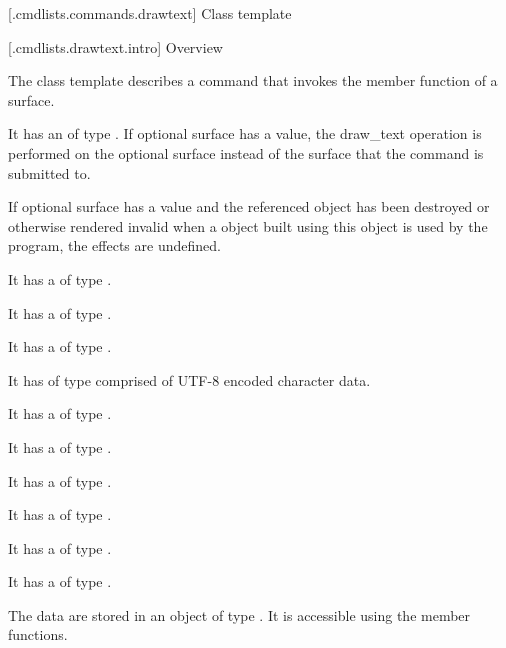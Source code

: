 
 [\iotwod.cmdlists.commands.drawtext] {Class template }

 [\iotwod.cmdlists.drawtext.intro] {Overview}

\pnum
{}%
The class template  describes a command that invokes the  member function of a surface.

\pnum
It has an  of type . If optional surface has a value, the draw_text operation is performed on the optional surface instead of the surface that the command is submitted to.

\pnum
If optional surface has a value and the referenced  object has been destroyed or otherwise rendered invalid when a  object built using this  object is used by the program, the effects are undefined.

\pnum
It has a  of type .

\pnum
It has a  of type .

\pnum
It has a  of type .

\pnum
It has  of type  comprised of UTF-8 encoded character data.

\pnum
It has a  of type .

\pnum
It has a  of type .

\pnum
It has a  of type .

\pnum
It has a  of type .

\pnum
It has a  of type .

\pnum
It has a  of type .

\pnum
The data are stored in an object of type . It is accessible using the  member functions.

